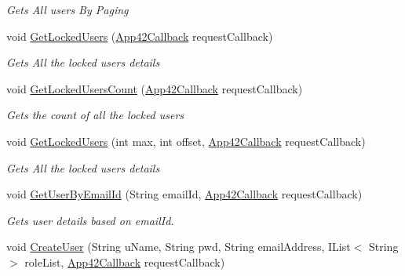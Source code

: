 \begin{DoxyCompactItemize}
\begin{DoxyCompactList}\small\item\em Gets All users By Paging \end{DoxyCompactList}\item 
void \hyperlink{classcom_1_1shephertz_1_1app42_1_1paas_1_1sdk_1_1windows_1_1user_1_1_user_service_ae810559775805a34ee1205dd4e76d0df}{Get\+Locked\+Users} (\hyperlink{interfacecom_1_1shephertz_1_1app42_1_1paas_1_1sdk_1_1windows_1_1_app42_callback}{App42\+Callback} request\+Callback)
\begin{DoxyCompactList}\small\item\em Gets All the locked users details \end{DoxyCompactList}\item 
void \hyperlink{classcom_1_1shephertz_1_1app42_1_1paas_1_1sdk_1_1windows_1_1user_1_1_user_service_af2092558fd52d93ba256cbf371317550}{Get\+Locked\+Users\+Count} (\hyperlink{interfacecom_1_1shephertz_1_1app42_1_1paas_1_1sdk_1_1windows_1_1_app42_callback}{App42\+Callback} request\+Callback)
\begin{DoxyCompactList}\small\item\em Gets the count of all the locked users \end{DoxyCompactList}\item 
void \hyperlink{classcom_1_1shephertz_1_1app42_1_1paas_1_1sdk_1_1windows_1_1user_1_1_user_service_a7dd2c4c0fafa7d0cb05fed4e556d0f71}{Get\+Locked\+Users} (int max, int offset, \hyperlink{interfacecom_1_1shephertz_1_1app42_1_1paas_1_1sdk_1_1windows_1_1_app42_callback}{App42\+Callback} request\+Callback)
\begin{DoxyCompactList}\small\item\em Gets All the locked users details \end{DoxyCompactList}\item 
void \hyperlink{classcom_1_1shephertz_1_1app42_1_1paas_1_1sdk_1_1windows_1_1user_1_1_user_service_a17c9c9f51d99783bc633b5dffda81901}{Get\+User\+By\+Email\+Id} (String email\+Id, \hyperlink{interfacecom_1_1shephertz_1_1app42_1_1paas_1_1sdk_1_1windows_1_1_app42_callback}{App42\+Callback} request\+Callback)
\begin{DoxyCompactList}\small\item\em Gets user details based on email\+Id. \end{DoxyCompactList}\item 
void \hyperlink{classcom_1_1shephertz_1_1app42_1_1paas_1_1sdk_1_1windows_1_1user_1_1_user_service_a29fa82e562c42245954e685c84050782}{Create\+User} (String u\+Name, String pwd, String email\+Address, I\+List$<$ String $>$ role\+List, \hyperlink{interfacecom_1_1shephertz_1_1app42_1_1paas_1_1sdk_1_1windows_1_1_app42_callback}{App42\+Callback} request\+Callback)

\end{DoxyCompactItemize}
